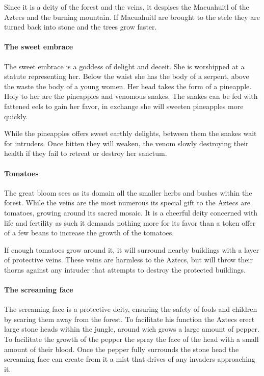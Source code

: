 \documentclass[a4paper]{book}
\begin{document}
				Since it is a deity of the forest and the veins,
				it despises the Macuahuitl of the \gls{Aztecs} and the burning mountain.
				If Macuahuitl are brought to the stele they are turned back into stone and the trees grow faster.

			\paragraph{The sweet embrace}
				The sweet embrace is a goddess of delight and deceit.
				She is worshipped at a statute representing her.
				Below the waist she has the body of a serpent,
				above the waste the body of a young women.
				Her head takes the form of a pineapple.
				Holy to her are the pineapples and venomous snakes.
				The snakes can be fed with fattened eels to gain her favor,
				in exchange she will sweeten pineapples more quickly.

				While the pineapples offers sweet earthly delights,
				between them the snakes wait for intruders.
				Once bitten they will weaken, the venom slowly destroying their health
				if they fail to retreat or destroy her sanctum.

			\paragraph{Tomatoes}
				The great bloom sees as its domain all the smaller herbs and bushes within the forest.
				While the veins are the most numerous its special gift to the \gls{Aztecs} are tomatoes,
				growing around its sacred mosaic.
				It is a cheerful deity concerned with life and fertility as such it demands
				nothing more for its favor than a token offer of a few beans to increase the growth of the tomatoes.

				If enough tomatoes grow around it,
				it will surround nearby buildings with a layer of protective veins.
				These veins are harmless to the \gls{Aztecs},
				but will throw their thorns against any intruder that attempts
				to destroy the protected buildings.

			\paragraph{The screaming face}
				The screaming face is a protective deity,
				ensuring the safety of fools and children by scaring them away from the forest.
				To facilitate his function the \gls{Aztecs} erect large stone heads within the jungle,
				around wich grows a large amount of pepper.
				To facilitate the growth of the pepper the spray the face of the head with a small amount of their blood.
				Once the pepper fully surrounds the stone head
				the screaming face can create from it a mist that drives of any invaders approaching it.
\end{document}

